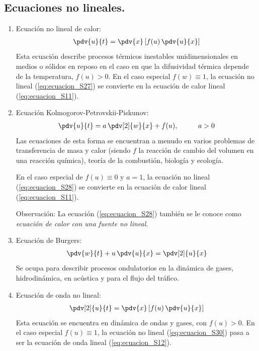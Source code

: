 \subsection{Ecuaciones no lineales.}
\begin{enumerate}
\item Ecuación no lineal de calor:
\begin{align}
\pdv{u}{t} = \pdv{x} \left[ f(u) \, \pdv{u}{x} \right]
\label{eq:ecuacion_S27}  
\end{align}
Esta ecuación describe procesos térmicos inestables unidimensionales en medios o sólidos en reposo en el caso en que la difusividad térmica depende de la temperatura, $f (u)> 0$. En el caso especial $f (w) \equiv 1$, la ecuación no lineal (\ref{eq:ecuacion_S27}) se convierte en la ecuación de calor lineal (\ref{eq:ecuacion_S11}).
\item Ecuación Kolmogorov-Petrovskii-Piskunov:
\begin{align}
\pdv{u}{t} = a \, \pdv[2]{w}{x} + f(u), \hspace{1cm} a > 0
\label{eq:ecuacion_S28}
\end{align}
Las ecuaciones de esta forma se encuentran a menudo en varios problemas de transferencia de masa y calor (siendo $f$ la reacción de cambio del volumen en una reacción química), teoría de la combustión, biología y ecología.
\par
En el caso especial de $f (u) \equiv 0$ y $a = 1$, la ecuación no lineal (\ref{eq:ecuacion_S28}) se convierte en la ecuación de calor lineal (\ref{eq:ecuacion_S11}).
\par
Observación: La ecuación (\ref{eq:ecuacion_S28}) también se le conoce como \emph{ecuación de calor con una fuente no lineal}.
\item Ecuación de Burgers:
\begin{align}
\pdv{w}{t} + u \, \pdv{u}{x} = \pdv[2]{u}{x}
\label{eq:ecuacion_S29}
\end{align}
Se ocupa para describir procesos ondulatorios en la dinámica de gases, hidrodinámica, en acústica y para el flujo del tráfico.
\item Ecuación de onda no lineal:
\begin{align}
\pdv[2]{u}{t} = \pdv{x} \left[ f(u) \, \pdv{u}{x} \right]
\label{eq:ecuacion_S30}
\end{align}
Esta ecuación se encuentra en dinámica de ondas y gases, con $f(u) > 0$. En el caso especial $f(u) \equiv 1$, la ecuación no lineal (\ref{eq:ecuacion_S30}) pasa a ser la ecuación de onda lineal (\ref{eq:ecuacion_S12}).

\end{enumerate}
